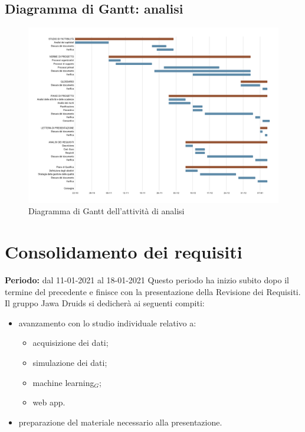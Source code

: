 \subsection{Diagramma di Gantt: analisi}\label{PianificazioneDiagrammaDiGanttAnalisi}
\begin{figure}[!h]
	\begin{center}
		\includegraphics[width=1\linewidth]{../immagini/pdp/gantt_analisi.png}
		\caption{Diagramma di Gantt dell'attività di analisi}
	\end{center}
\end{figure}

\section{Consolidamento dei requisiti}\label{PianificazioneConsolidamentoDeiRequisiti}
\textbf{Periodo:} dal 11-01-2021 al 18-01-2021
Questo periodo ha inizio subito dopo il termine del precedente e finisce con la presentazione della Revisione dei Requisiti.
Il gruppo Jawa Druids si dedicherà ai seguenti compiti:
\begin{itemize}
	\item avanzamento con lo studio individuale relativo a:
	\begin{itemize}
		\item acquisizione dei dati;
		\item simulazione dei dati;
		\item machine learning$_G$;
		\item web app.
	\end{itemize}
	\item preparazione del materiale necessario alla presentazione.
\end{itemize}
